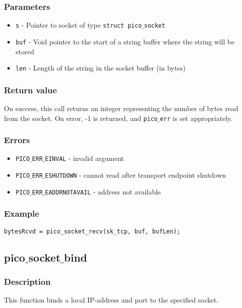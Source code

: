 \subsubsection*{Parameters}
\begin{itemize}[noitemsep]
\item \texttt{s} - Pointer to socket of type \texttt{struct pico$\_$socket}
\item \texttt{buf} - Void pointer to the start of a string buffer where the string will be stored
\item \texttt{len} - Length of the string in the socket buffer (in bytes)
\end{itemize}

\subsubsection*{Return value}
On success, this call returns an integer representing the number of bytes read
from the socket. On error, -1 is returned, and \texttt{pico$\_$err} is set appropriately.

\subsubsection*{Errors}
\begin{itemize}[noitemsep]
\item \texttt{PICO$\_$ERR$\_$EINVAL} - invalid argument
\item \texttt{PICO$\_$ERR$\_$ESHUTDOWN} - cannot read after transport endpoint shutdown
\item \texttt{PICO$\_$ERR$\_$EADDRNOTAVAIL} - address not available
\end{itemize}

\subsubsection*{Example}
\begin{verbatim}
bytesRcvd = pico_socket_recv(sk_tcp, buf, bufLen);
\end{verbatim}


\subsection{pico$\_$socket$\_$bind}

\subsubsection*{Description}
This function binds a local IP-address and port to the specified socket.

